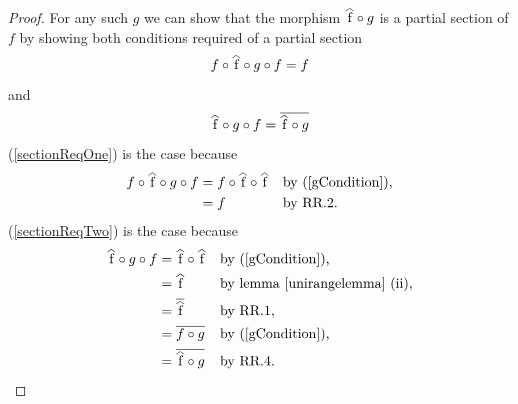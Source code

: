 \documentclass[10pt,a4paper]{article}
\theoremstyle{remark}
\begin{document}
\begin{proof}
For any such $g$ we can show that the morphism $\rng{f} \circ g$ is a partial section of $f$
by showing  both conditions required of a partial section 
\begin{equation}
\label{sectionReqOne}
f \circ \rng{f} \circ g \circ f = f
\end{equation}  
and
\begin{equation}
\label{sectionReqTwo}
\rng{f} \circ g \circ f = \rst{\rng{f} \circ g}
\end{equation}
(\ref{sectionReqOne}) is the case because
\begin{align*}
f \circ \rng{f} \circ g \circ f &=  f \circ \rng{f} \circ \rng{f}     
                                               && \mbox{by (\ref{gCondition}),} \\
                                &=f       
                                               && \mbox{by RR.2.} 
\end{align*}
(\ref{sectionReqTwo}) is the case because
\begin{align*}
\rng{f} \circ g \circ f  &= \rng{f} \circ \rng{f}       
                                               && \mbox{by (\ref{gCondition}),} \\
                         &= \rng{f}     
                                               && \mbox{by lemma \ref{unirangelemma} (ii),} \\
                         &= \rst{\rng{f}}     
                                               && \mbox{by RR.1,} \\
                         &= \rst{f \circ g}    
                                               && \mbox{by (\ref{gCondition}),}\\
                         &= \rst{\rng{f} \circ g}     
                                               && \mbox{by RR.4.} \\
\end{align*}
\end{proof}
\end{document}
